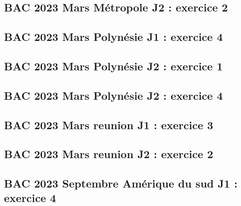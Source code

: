 \documentclass[lang=fr,edition=teacher,layout=sheet]{mxbook}
\begin{document}
\par\bigskip
{}\subsection*{BAC 2023 Mars Métropole J2 : exercice 2}
\begingroup\endgroup
\par\bigskip
{}\subsection*{BAC 2023 Mars Polynésie J1 : exercice 4}
\begingroup\endgroup
\par\bigskip
{}\subsection*{BAC 2023 Mars Polynésie J2 : exercice 1}
\begingroup\endgroup
\par\bigskip
{}\subsection*{BAC 2023 Mars Polynésie J2 : exercice 4}
\begingroup\endgroup
\par\bigskip
{}\subsection*{BAC 2023 Mars reunion J1 : exercice 3}
\begingroup\endgroup
\par\bigskip
{}\subsection*{BAC 2023 Mars reunion J2 : exercice 2}
\begingroup\endgroup
\par\bigskip
{}\subsection*{BAC 2023 Septembre Amérique du sud J1 : exercice 4}
\end{document}

